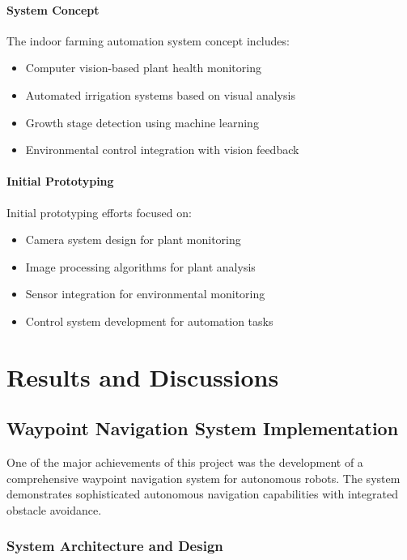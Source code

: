 \documentclass{book}
\begin{document}
\subsubsection{System Concept}
\par\noindent The indoor farming automation system concept includes:

\begin{itemize}
\item Computer vision-based plant health monitoring
\item Automated irrigation systems based on visual analysis
\item Growth stage detection using machine learning
\item Environmental control integration with vision feedback
\end{itemize}

\subsubsection{Initial Prototyping}
\par\noindent Initial prototyping efforts focused on:

\begin{itemize}
\item Camera system design for plant monitoring
\item Image processing algorithms for plant analysis
\item Sensor integration for environmental monitoring
\item Control system development for automation tasks
\end{itemize}

\chapter{Results and Discussions}

\section{Waypoint Navigation System Implementation}

\par\noindent One of the major achievements of this project was the development of a comprehensive waypoint navigation system for autonomous robots. The system demonstrates sophisticated autonomous navigation capabilities with integrated obstacle avoidance.

\subsection{System Architecture and Design}
\end{document}
